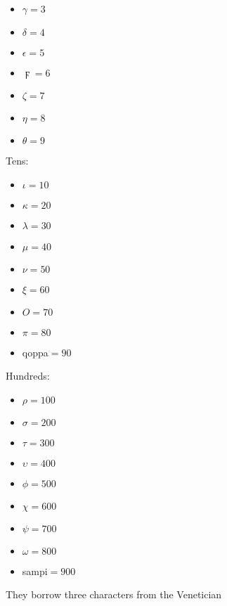 \documentclass{report}
\begin{document}
\begin{description}
\begin{mdframed}
\begin{itemize}
\begin{itemize}
                        \item $\gamma = 3$
                        \item $\delta = 4$
                        \item $\epsilon = 5$
                        \item $\digamma = 6$
                        \item $\zeta = 7$
                        \item $\eta = 8$
                        \item $\theta = 9$
                    \end{itemize}
                    Tens:
                    \begin{itemize}
                        \item $\iota = 10$
                        \item $\kappa = 20$
                        \item $\lambda = 30$
                        \item $\mu = 40$
                        \item $\nu = 50$
                        \item $\xi = 60$
                        \item $O = 70$
                        \item $\pi = 80$
                        \item qoppa$ = 90$
                    \end{itemize}
                    Hundreds:
                    \begin{itemize}
                        \item $\rho = 100$ 
                        \item $\sigma = 200$
                        \item $\tau = 300$
                        \item $\upsilon = 400$
                        \item $\phi = 500$
                        \item $\chi = 600$
                        \item $\psi = 700$
                        \item $\omega = 800$
                        \item sampi$ = 900$
                    \end{itemize}
            \end{itemize}
            They borrow three characters from the Venetician

\end{mdframed}
\end{description}
\end{document}
